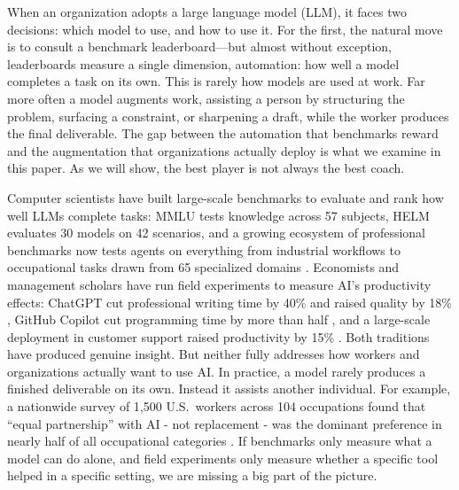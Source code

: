 
When an organization adopts a large language model (LLM), it faces two decisions: which model to use, and how to use it. For the first, the natural move is to consult a benchmark leaderboard—but almost without exception, leaderboards measure a single dimension, automation: how well a model completes a task on its own. This is rarely how models are used at work. Far more often a model augments work, assisting a person by structuring the problem, surfacing a constraint, or sharpening a draft, while the worker produces the final deliverable. The gap between the automation that benchmarks reward and the augmentation that organizations actually deploy is what we examine in this paper. As we will show, the best player is not always the best coach.

Computer scientists have built large-scale benchmarks to evaluate and rank how well LLMs complete tasks: MMLU \citep{hendrycks2021} tests knowledge across 57 subjects, HELM \citep{liang2023} evaluates 30 models on 42 scenarios, and a growing ecosystem of professional benchmarks now tests agents on everything from industrial workflows \citep{sopbench2025} to occupational tasks drawn from 65 specialized domains \citep{occubench2026}. Economists and management scholars have run field experiments to measure AI's productivity effects: ChatGPT cut professional writing time by 40\% and raised quality by 18\% \citep{noy2023}, GitHub Copilot cut programming time by more than half \citep{peng2023}, and a large-scale deployment in customer support raised productivity by 15\% \citep{brynjolfsson2025}. Both traditions have produced genuine insight. But neither fully addresses how workers and organizations actually want to use AI. In practice, a model rarely produces a finished deliverable on its own. Instead it assists another individual. For example, a nationwide survey of 1,500 U.S.\ workers across 104 occupations found that ``equal partnership'' with AI - not replacement - was the dominant preference in nearly half of all occupational categories \citep{shao2025}. If benchmarks only measure what a model can do alone, and field experiments only measure whether a specific tool helped in a specific setting, we are missing a big part of the picture.

